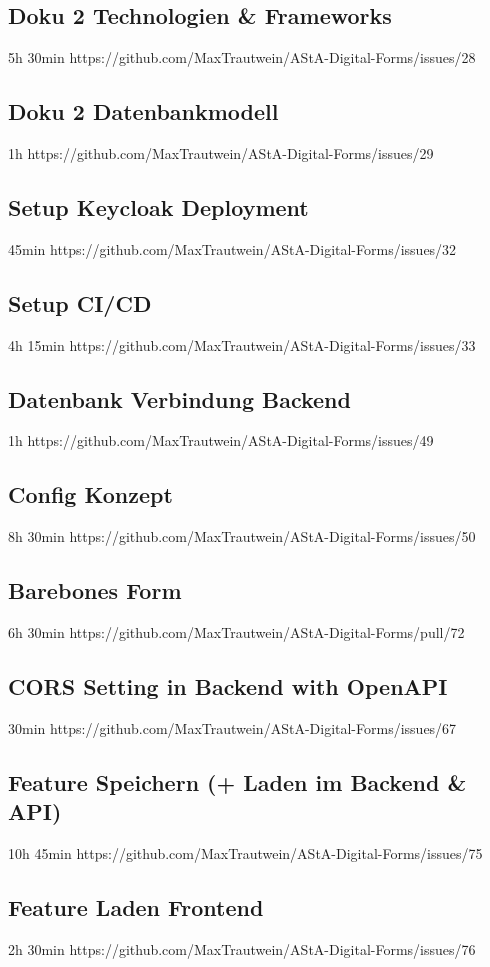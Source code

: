 \subsection{Doku 2 Technologien & Frameworks}
5h 30min
https://github.com/MaxTrautwein/AStA-Digital-Forms/issues/28

\subsection{Doku 2 Datenbankmodell}
1h
https://github.com/MaxTrautwein/AStA-Digital-Forms/issues/29
\subsection{Setup Keycloak Deployment}
45min
https://github.com/MaxTrautwein/AStA-Digital-Forms/issues/32
\subsection{Setup CI/CD}
4h 15min
https://github.com/MaxTrautwein/AStA-Digital-Forms/issues/33
\subsection{Datenbank Verbindung Backend}
1h
https://github.com/MaxTrautwein/AStA-Digital-Forms/issues/49

\subsection{Config Konzept}
8h 30min
https://github.com/MaxTrautwein/AStA-Digital-Forms/issues/50

\subsection{Barebones Form}
6h 30min
https://github.com/MaxTrautwein/AStA-Digital-Forms/pull/72
\subsection{CORS Setting in Backend with OpenAPI}
30min
https://github.com/MaxTrautwein/AStA-Digital-Forms/issues/67
\subsection{Feature Speichern (+ Laden im Backend & API)}
10h 45min
https://github.com/MaxTrautwein/AStA-Digital-Forms/issues/75
\subsection{Feature Laden Frontend}
2h 30min
https://github.com/MaxTrautwein/AStA-Digital-Forms/issues/76
